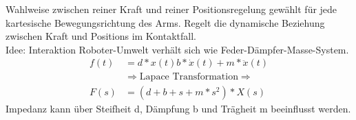 Wahlweise zwischen reiner Kraft und reiner Positionsregelung gewählt für jede kartesische Bewegungsrichtung
des Arms.
Regelt die dynamische Beziehung zwischen Kraft und Positions im Kontaktfall. \\
Idee: Interaktion Roboter-Umwelt verhält sich wie Feder-Dämpfer-Masse-System.
\begin{align}
     f(t) &= d * x(t)b * \dot{x}(t) + m * \ddot{x}(t)\\
     &\Rightarrow \text{Lapace Transformation} \Rightarrow \\
     F(s) &= (d + b+ s+ m *s ^2) * X(s)
\end{align}
Impedanz kann über Steifheit d, Dämpfung b und Trägheit m beeinflusst werden.
